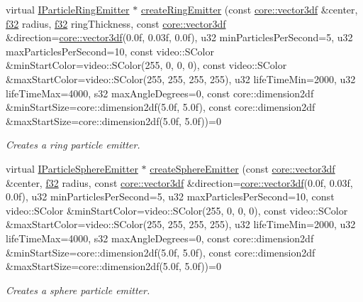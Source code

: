 \begin{DoxyCompactItemize}
virtual \hyperlink{classirr_1_1scene_1_1IParticleRingEmitter}{I\+Particle\+Ring\+Emitter} $\ast$ \hyperlink{classirr_1_1scene_1_1IParticleSystemSceneNode_adee7e28b730ce82ae78e01ccccfff98e}{create\+Ring\+Emitter} (const \hyperlink{namespaceirr_1_1core_a06f169d08b5c429f5575acb7edbad811}{core\+::vector3df} \&center, \hyperlink{namespaceirr_a0277be98d67dc26ff93b1a6a1d086b07}{f32} radius, \hyperlink{namespaceirr_a0277be98d67dc26ff93b1a6a1d086b07}{f32} ring\+Thickness, const \hyperlink{namespaceirr_1_1core_a06f169d08b5c429f5575acb7edbad811}{core\+::vector3df} \&direction=\hyperlink{namespaceirr_1_1core_a06f169d08b5c429f5575acb7edbad811}{core\+::vector3df}(0.\+0f, 0.\+03f, 0.\+0f), u32 min\+Particles\+Per\+Second=5, u32 max\+Particles\+Per\+Second=10, const video\+::\+S\+Color \&min\+Start\+Color=video\+::\+S\+Color(255, 0, 0, 0), const video\+::\+S\+Color \&max\+Start\+Color=video\+::\+S\+Color(255, 255, 255, 255), u32 life\+Time\+Min=2000, u32 life\+Time\+Max=4000, s32 max\+Angle\+Degrees=0, const core\+::dimension2df \&min\+Start\+Size=core\+::dimension2df(5.\+0f, 5.\+0f), const core\+::dimension2df \&max\+Start\+Size=core\+::dimension2df(5.\+0f, 5.\+0f))=0
\begin{DoxyCompactList}\small\item\em Creates a ring particle emitter. \end{DoxyCompactList}\item 
virtual \hyperlink{classirr_1_1scene_1_1IParticleSphereEmitter}{I\+Particle\+Sphere\+Emitter} $\ast$ \hyperlink{classirr_1_1scene_1_1IParticleSystemSceneNode_abb4fe6b6346ede961805166fc5355fef}{create\+Sphere\+Emitter} (const \hyperlink{namespaceirr_1_1core_a06f169d08b5c429f5575acb7edbad811}{core\+::vector3df} \&center, \hyperlink{namespaceirr_a0277be98d67dc26ff93b1a6a1d086b07}{f32} radius, const \hyperlink{namespaceirr_1_1core_a06f169d08b5c429f5575acb7edbad811}{core\+::vector3df} \&direction=\hyperlink{namespaceirr_1_1core_a06f169d08b5c429f5575acb7edbad811}{core\+::vector3df}(0.\+0f, 0.\+03f, 0.\+0f), u32 min\+Particles\+Per\+Second=5, u32 max\+Particles\+Per\+Second=10, const video\+::\+S\+Color \&min\+Start\+Color=video\+::\+S\+Color(255, 0, 0, 0), const video\+::\+S\+Color \&max\+Start\+Color=video\+::\+S\+Color(255, 255, 255, 255), u32 life\+Time\+Min=2000, u32 life\+Time\+Max=4000, s32 max\+Angle\+Degrees=0, const core\+::dimension2df \&min\+Start\+Size=core\+::dimension2df(5.\+0f, 5.\+0f), const core\+::dimension2df \&max\+Start\+Size=core\+::dimension2df(5.\+0f, 5.\+0f))=0
\begin{DoxyCompactList}\small\item\em Creates a sphere particle emitter. \end{DoxyCompactList}\item 

\end{DoxyCompactItemize}
